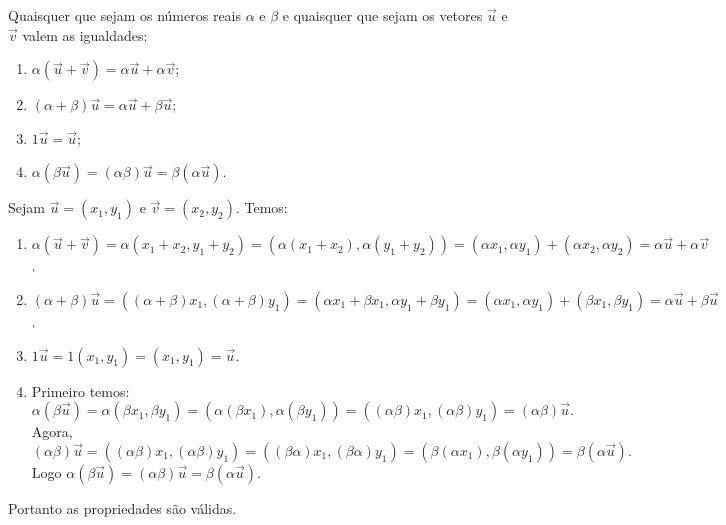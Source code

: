 \begin{propriedades}
  Quaisquer que sejam os n\'umeros reais $\alpha$ e $\beta$ e quaisquer que sejam os vetores $\vec{u}$ e $\vec{v}$ valem as igualdades:
  \begin{enumerate}[label=({\roman*})]
    \item $\alpha(\vec{u} + \vec{v}) = \alpha\vec{u} + \alpha\vec{v}$;
    \item $(\alpha + \beta)\vec{u} = \alpha\vec{u} + \beta\vec{u}$;
    \item $1\vec{u} = \vec{u}$;
    \item $\alpha(\beta\vec{u}) = (\alpha\beta)\vec{u} = \beta(\alpha\vec{u})$.
  \end{enumerate}
\end{propriedades}
\begin{prova}
	Sejam $\vec{u} = (x_1,y_1)$ e $\vec{v} = (x_2,y_2)$. Temos:
	\begin{enumerate}[label=({\roman*})]
		\item $\alpha(\vec{u} + \vec{v}) = \alpha(x_1+x_2,y_1+y_2) = (\alpha(x_1+x_2),\alpha(y_1+y_2)) = (\alpha x_1,\alpha y_1) + (\alpha x_2,\alpha y_2) =  \alpha\vec{u} + \alpha\vec{v}$.
		\item $(\alpha + \beta)\vec{u} = ((\alpha+\beta)x_1,(\alpha+\beta)y_1) = (\alpha x_1 + \beta x_1, \alpha y_1 + \beta y_1) = (\alpha x_1,\alpha y_1) + (\beta x_1,\beta y_1) = \alpha\vec{u} + \beta\vec{u}$.
		\item $1\vec{u} = 1(x_1,y_1) = (x_1,y_1) = \vec{u}$.
		\item Primeiro temos:
		\[
			\alpha(\beta\vec{u}) = \alpha(\beta x_1,\beta y_1) = (\alpha(\beta x_1),\alpha(\beta y_1)) = ((\alpha\beta)x_1,(\alpha\beta)y_1) = (\alpha\beta)\vec{u}.
		\]
		Agora,
		\[
			(\alpha\beta)\vec{u} = 	((\alpha\beta)x_1,(\alpha\beta)y_1) = ((\beta\alpha)x_1,(\beta\alpha)y_1) = (\beta(\alpha x_1),\beta(\alpha y_1)) = \beta(\alpha\vec{u}).
		\]
		Logo $\alpha(\beta\vec{u}) = (\alpha\beta)\vec{u} = \beta(\alpha\vec{u})$.
	\end{enumerate}
	Portanto as propriedades s\~ao v\'alidas.
\end{prova}


